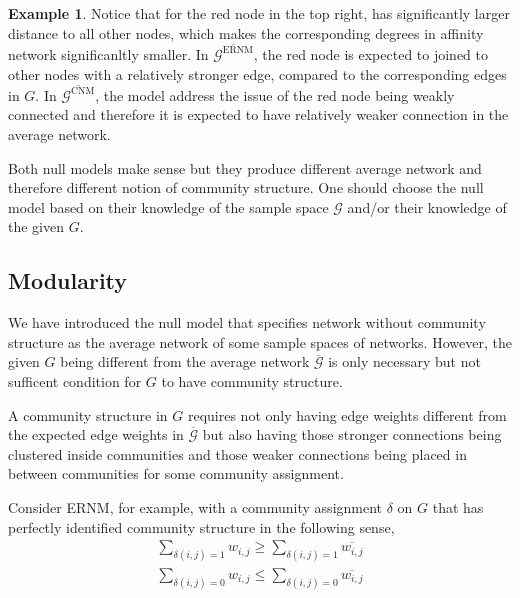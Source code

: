 \documentclass[11pt]{article}
\theoremstyle{definition}
\theoremstyle{definition}
\newtheorem{eg}{Example}
\theoremstyle{definition}
\theoremstyle{remark}
\theoremstyle{plain}
\begin{document}
\begin{eg}
	Notice that for the red node in the top right, has significantly larger distance to all other nodes, which makes the corresponding degrees in affinity network significanltly smaller. In $\overline{\mathcal{G}^{\text{ERNM}}}$, the red node is expected to joined to other nodes with a relatively stronger edge, compared to the corresponding edges in $G$. In $\overline{\mathcal{G}^{\text{CNM}}}$, the model address the issue of the red node being weakly connected and therefore it is expected to have relatively weaker connection in the average network.

	Both null models make sense but they produce different average network and therefore different notion of community structure. One should choose the null model based on their knowledge of the sample space $\mathcal{G}$ and/or their knowledge of the given $G$. 
	


\end{eg}


\subsection{Modularity}

We have introduced the null model that specifies network without community structure as the average network of some sample spaces of networks. However, the given $G$ being different from the average network $\overline{\mathcal{G}}$ is only necessary but not sufficent condition for $G$ to have community structure. 

A community structure in $G$ requires not only having edge weights different from the expected edge weights in $\overline{\mathcal{G}}$ but also having those stronger connections being clustered inside communities and those weaker connections being placed in between communities for some community assignment.

Consider ERNM, for example, with a community assignment $\delta$ on $G$ that has perfectly identified community structure in the following sense,
\begin{subequations}
	\begin{align}
		\sum_{\delta(i,j) = 1} w_{i,j} \geq \sum_{\delta(i,j) = 1} \overline{w_{i,j}} \label{subeq:internal-edge}\\
		\sum_{\delta(i,j) = 0} w_{i,j} \leq \sum_{\delta(i,j) = 0} \overline{w_{i,j}}\label{subeq:inter-edge}
	\end{align}
\end{subequations}
\end{document}
